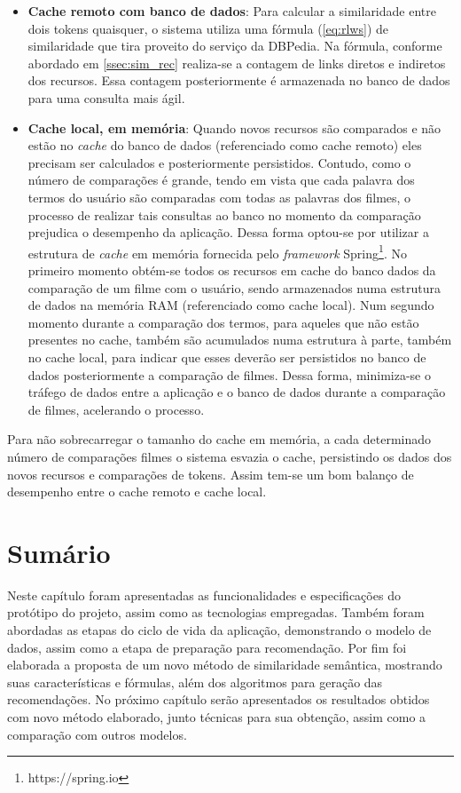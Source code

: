 \begin{itemize}
	\item{\textbf{Cache remoto com banco de dados}: Para calcular a similaridade entre dois tokens quaisquer, o sistema utiliza uma fórmula (\ref{eq:rlws}) de similaridade que tira proveito do serviço da DBPedia. Na fórmula, conforme abordado em \ref{ssec:sim_rec} realiza-se a contagem de links diretos e indiretos dos recursos. Essa contagem posteriormente é armazenada no banco de dados para uma consulta mais ágil.}
	\item{\textbf{Cache local, em memória}: Quando novos recursos são comparados e não estão no \textit{cache} do banco de dados (referenciado como cache remoto) eles precisam ser calculados e posteriormente persistidos. Contudo, como o número de comparações é grande, tendo em vista que cada palavra dos termos do usuário são comparadas com todas as palavras dos filmes, o processo de realizar tais consultas ao banco no momento da comparação prejudica o desempenho da aplicação. Dessa forma optou-se por utilizar a estrutura de \textit{cache} em memória fornecida pelo \textit{framework} Spring\footnote{https://spring.io}. No primeiro momento obtém-se todos os recursos em cache do banco dados da comparação de um filme com o usuário, sendo armazenados numa estrutura de dados na memória \ac{RAM} (referenciado como cache local). Num segundo momento durante a comparação dos termos, para aqueles que não estão presentes no cache, também são acumulados numa estrutura à parte, também no cache local, para indicar que esses deverão ser persistidos no banco de dados posteriormente a comparação de filmes. Dessa forma, minimiza-se o tráfego de dados entre a aplicação e o banco de dados durante a comparação de filmes, acelerando o processo.}
\end{itemize}
	
Para não sobrecarregar o tamanho do cache em memória, a cada determinado número de comparações filmes o sistema esvazia o cache, persistindo os dados dos novos recursos e comparações de tokens. Assim tem-se um bom balanço de desempenho entre o cache remoto e cache local.

\section{Sumário}

Neste capítulo foram apresentadas as funcionalidades e especificações do protótipo do projeto, assim como as tecnologias empregadas. Também foram abordadas as etapas do ciclo de vida da aplicação, demonstrando o modelo de dados, assim como a etapa de preparação para recomendação. Por fim foi elaborada a proposta de um novo método de similaridade semântica, mostrando suas características e fórmulas, além dos algoritmos para geração das recomendações. No próximo capítulo serão apresentados os resultados obtidos com novo método elaborado, junto técnicas para sua obtenção, assim como a comparação com outros modelos.